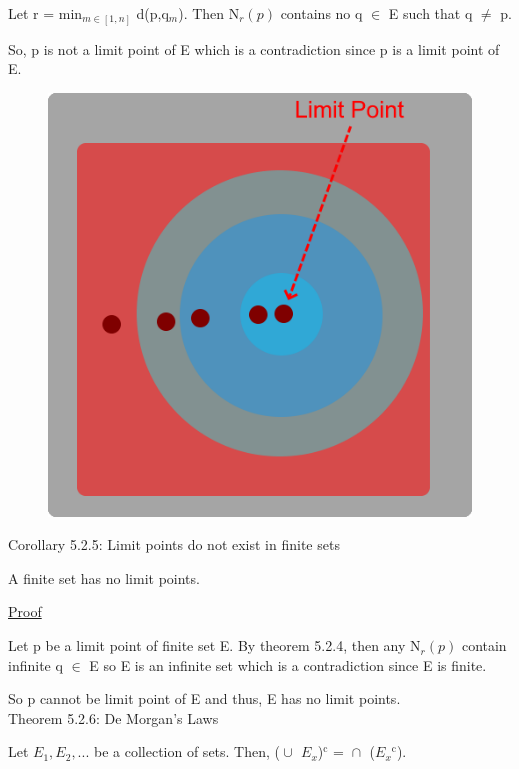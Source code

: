 	Let r = min$_{m \in [1,n]}$ d(p,q$_m$). Then N$_r(p)$ contains no q $\in$ E such that q $\not =$ p.

	So, p is not a limit point of E which is a contradiction since p is a limit point of E.

\begin{figure}[h]
	\centering
	\includegraphics[scale=0.33]{Images/5.2.4.png}
\end{figure}

{ \color{orange} Corollary 5.2.5: Limit points do not exist in finite sets } 
	
	\begin{adjustbox}{minipage=14cm, right}
		A finite set has no limit points.
	\end{adjustbox}

{ \color{magenta} \underline{Proof} } 

	Let p be a limit point of finite set E. By {\color{red} theorem 5.2.4}, 
	then any N$_r(p)$ contain infinite q $\in$ E so E is an infinite set
	which is a contradiction since E is finite.

	So p cannot be limit point of E and thus, E has no limit points. \\

{ \color{red} Theorem 5.2.6: De Morgan's Laws } 
	
	\begin{adjustbox}{minipage=14cm, right}
		Let $E_1, E_2 , ... $ be a collection of sets. Then,
		($\cup_{}^{}$ $E_x$)$^\text{c}$ = $\cap_{}^{}$ ($E_x$$^\text{c}$).
	\end{adjustbox}

